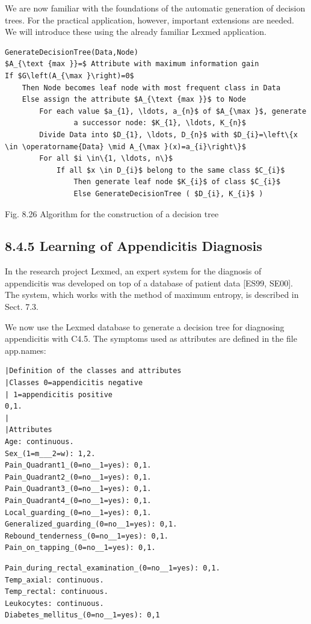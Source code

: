 \documentclass[10pt]{article}
\begin{document}
We are now familiar with the foundations of the automatic generation of decision trees. For the practical application, however, important extensions are needed. We will introduce these using the already familiar Lexmed application.

\begin{verbatim}
GenerateDecisionTree(Data,Node)
$A_{\text {max }}=$ Attribute with maximum information gain
If $G\left(A_{\max }\right)=0$
    Then Node becomes leaf node with most frequent class in Data
    Else assign the attribute $A_{\text {max }}$ to Node
        For each value $a_{1}, \ldots, a_{n}$ of $A_{\max }$, generate
                a successor node: $K_{1}, \ldots, K_{n}$
        Divide Data into $D_{1}, \ldots, D_{n}$ with $D_{i}=\left\{x \in \operatorname{Data} \mid A_{\max }(x)=a_{i}\right\}$
        For all $i \in\{1, \ldots, n\}$
            If all $x \in D_{i}$ belong to the same class $C_{i}$
                Then generate leaf node $K_{i}$ of class $C_{i}$
                Else GenerateDecisionTree ( $D_{i}, K_{i}$ )
\end{verbatim}

Fig. 8.26 Algorithm for the construction of a decision tree

\subsection*{8.4.5 Learning of Appendicitis Diagnosis}
In the research project Lexmed, an expert system for the diagnosis of appendicitis was developed on top of a database of patient data [ES99, SE00]. The system, which works with the method of maximum entropy, is described in Sect. 7.3.

We now use the Lexmed database to generate a decision tree for diagnosing appendicitis with C4.5. The symptoms used as attributes are defined in the file app.names:

\begin{verbatim}
|Definition of the classes and attributes
|Classes 0=appendicitis negative
| 1=appendicitis positive
0,1.
|
|Attributes
Age: continuous.
Sex_(1=m___2=w): 1,2.
Pain_Quadrant1_(0=no__1=yes): 0,1.
Pain_Quadrant2_(0=no__1=yes): 0,1.
Pain_Quadrant3_(0=no__1=yes): 0,1.
Pain_Quadrant4_(0=no__1=yes): 0,1.
Local_guarding_(0=no__1=yes): 0,1.
Generalized_guarding_(0=no__1=yes): 0,1.
Rebound_tenderness_(0=no__1=yes): 0,1.
Pain_on_tapping_(0=no__1=yes): 0,1.
\end{verbatim}

\begin{verbatim}
Pain_during_rectal_examination_(0=no__1=yes): 0,1.
Temp_axial: continuous.
Temp_rectal: continuous.
Leukocytes: continuous.
Diabetes_mellitus_(0=no__1=yes): 0,1
\end{verbatim}
\end{document}
